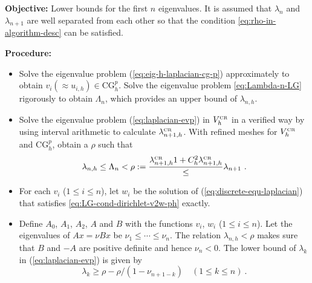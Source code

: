\documentclass[a4,11pt]{article}
\numberwithin{equation}{section}
\newcommand{\CR}{\mbox{\tiny{CR}}}
\begin{document}
\begin{algorithm}[h]
\caption{Guaranteed eigenvalue bounds by Lehmann--Goerisch's theorem}
\label{alg:Lehmann--Goerisch}
\begin{normalsize}

{{\bf Objective:} Lower bounds for} the first $n$ eigenvalues. It is assumed that $\lambda_n$ and $\lambda_{n+1}$ are well separated from each other so that the condition \eqref{eq:rho-in-algorithm-desc} can be satisfied.

\medskip

{\bf Procedure:}

\begin{itemize}
\item[Step 1:] {Solve the eigenvalue problem (\ref{eq:eig-h-laplacian-cg-p}) approximately to obtain $v_i (\approx u_{i,h}) \in \text{CG}^p_h $. 
Solve the eigenvalue problem 
\eqref{eq:Lambda-n-LG} rigorously to obtain $\Lambda_n$, which provides an upper bound of $\lambda_{n,h}$.}
	\item [{Step 2:}] Solve the eigenvalue problem (\ref{eq:laplacian-evp}) in $V_h^{\CR}$ { in a verified way by using interval arithmetic} to calculate $\lambda^{\CR}_{n+1,h}$. 
With refined meshes for $V_h^{\CR}$ and $\text{CG}^p_h$, obtain a $\rho$ such that
\begin{equation}
	\label{eq:rho-in-algorithm-desc}
\lambda_{n,h} \le \Lambda_n < \rho:= \frac{\lambda^{\CR}_{n+1,h}{1+C_h^2 \lambda^{\CR}_{n+1,h}}}  \le \lambda_{n+1} ~.
\end{equation}

\item [{Step 3:}]
For each $v_{i}$ ($1\le i \le n$),
let  $w_{i}$ be the solution of (\ref{eq:discrete-equ-laplacian}) that satisfies \cref{eq:LG-cond-dirichlet-v2w-ph} exactly.


\item [{Step 4:}] Define $A_0$, $A_1$, $A_2$, $A$ and $B$ with the functions
$v_{i}$, $w_{i}$ ($1\le i \le n$).
Let the eigenvalues of $Ax=\nu Bx$ be $\nu_1 \le \cdots \le \nu_{n}$. The relation  $\lambda_{n,h}  < \rho$ makes sure that $B$ and $-A$ are positive definite and hence $\nu_n<0$. The lower bound of $\lambda_k$ in (\ref{eq:laplacian-evp}) is given by
$$
\lambda_k \ge \rho - \rho/(1-\nu_{n+1-k})\quad (1\le k \le n)\:.
$$

\end{itemize}
\end{normalsize}
\end{algorithm}
\end{document}
